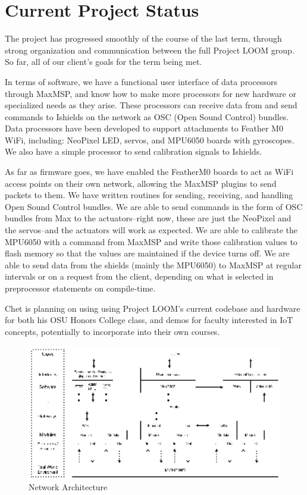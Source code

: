 \documentclass[onecolumn, draftclsnofoot,10pt, compsoc]{IEEEtran}
\begin{document}
\section{Current Project Status}
    The project has progressed smoothly of the course of the last term, through strong organization and communication between the full Project LOOM group. So far, all of our client's goals for the term being met. 

    In terms of software, we have a functional user interface of data processors through MaxMSP, and know how to make more processors for new hardware or specialized needs as they arise. These processors can receive data from and send commands to Ishields on the network as OSC (Open Sound Control) bundles. Data processors have been developed to support attachments to Feather M0 WiFi, including: NeoPixel LED, servos, and MPU6050 boards with gyroscopes. We also have a simple processor to send calibration signals to Ishields.

    As far as firmware goes, we have enabled the FeatherM0 boards to act as WiFi access points on their own network, allowing the MaxMSP plugins to send packets to them. We have written routines for sending, receiving, and handling Open Sound Control bundles. We are able to send commands in the form of OSC bundles from Max to the actuators--right now, these are just the NeoPixel and the servos--and the actuators will work as expected. We are able to calibrate the MPU6050 with a command from MaxMSP and write those calibration values to flash memory so that the values are maintained if the device turns off. We are able to send data from the shields (mainly the MPU6050) to MaxMSP at regular intervals or on a request from the client, depending on what is selected in preprocessor statements on compile-time.

    Chet is planning on using using Project LOOM's current codebase and hardware for both his OSU Honors College class, and demos for faculty interested in IoT concepts, potentially to incorporate into their own courses.


    \begin{figure}[H]
        \centering
        \caption{Network Architecture}
        \label{fig:network_architecture}
        \includegraphics[width=16cm]{network_architecture.eps}         
    \end{figure}
\end{document}
